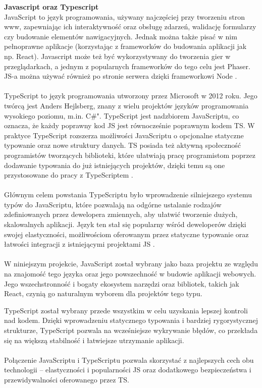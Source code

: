 \documentclass[twoside]{projektInzynierskiMS1}
\begin{document}
\noindent \textbf{Javascript oraz Typescript}\\
JavaScript to język programowania, używany najczęściej przy tworzeniu stron www, zapewniając ich interaktywność oraz obsługę zdarzeń, walidację formularzy czy budowanie elementów nawigacyjnych. Jednak można także pisać w nim pełnoprawne aplikacje (korzystając z frameworków do budowania aplikacji jak np. React). Javascript może też być wykorzystywany do tworzenia gier w przeglądarkach, a jednym z popularnych frameworków do tego celu jest Phaser. JS-a można używać również po stronie serwera dzięki frameworkowi Node \cite{JS}.
\\\\
TypeScript to język programowania utworzony przez Microsoft w 2012 roku. Jego twórcą jest Anders Hejlsberg, znany z wielu projektów języków programowania wysokiego poziomu, m.in. C\#". TypeScript jest nadzbiorem JavaScriptu, co oznacza, że każdy poprawny kod JS jest równocześnie poprawnym kodem TS. W praktyce TypeScript rozszerza możliwości JavaScriptu o opcjonalne statyczne typowanie oraz nowe struktury danych. TS posiada też aktywną społeczność programistów tworzących biblioteki, które ułatwiają pracę programistom poprzez dodawanie typowania do już istniejących projektów, dzięki temu są one przystosowane do pracy z TypeScriptem \cite{CoToTS}.
\\\\
Głównym celem powstania TypeScriptu było wprowadzenie silniejszego systemu typów do JavaScriptu, które pozwalają na odgórne ustalanie rodzajów zdefiniowanych przez dewelopera zmiennych, aby ułatwić tworzenie dużych, skalowalnych aplikacji. Język ten stał się popularny wśród deweloperów dzięki swojej elastyczności, możliwościom oferowanym przez statyczne typowanie oraz łatwości integracji z istniejącymi projektami JS \cite{CoToTS}.
\\\\
W niniejszym projekcie, JavaScript został wybrany jako baza projektu ze względu na znajomość tego języka oraz jego powszechność w budowie aplikacji webowych. Jego wszechstronność i bogaty ekosystem narzędzi oraz bibliotek, takich jak React, czynią go naturalnym wyborem dla projektów tego typu.

\newpage

\noindent
TypeScript został wybrany przede wszystkim w celu uzyskania lepszej kontroli nad kodem. Dzięki wprowadzeniu statycznego typowania i bardziej rygorystycznej strukturze, TypeScript pozwala na wcześniejsze wykrywanie błędów, co przekłada się na większą stabilność i łatwiejsze utrzymanie aplikacji.
\\\\
Połączenie JavaScriptu i TypeScriptu pozwala skorzystać z najlepszych cech obu technologii – elastyczności i popularności JS oraz dodatkowego bezpieczeństwa i przewidywalności oferowanego przez TS.
\\
\end{document}
